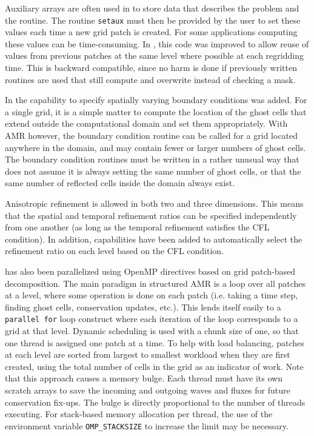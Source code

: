 Auxiliary arrays are often used in \clawpack to store data that
describes the problem and the routine.
The routine \texttt{setaux} must then be provided by the user to set these values each time a
new grid patch is created.  For some applications computing these values can be time-consuming.  In ,
this code was improved to allow reuse of values from previous patches at
the same level where possible at each regridding time.
This is backward compatible, since no harm is done if previously
written routines are used that still compute and overwrite instead of
checking a mask.

In  the capability to specify spatially varying boundary
conditions was added. For a single grid, it is a simple matter to
compute the location of the ghost cells that extend outside the
computational domain and set them appropriately.  With AMR however,
the boundary condition routine can be called for a grid located
anywhere in the domain, and may contain fewer or larger numbers of
ghost cells. The boundary condition routines must be written in a
rather unusual way that does not assume it is always setting the same
number of ghost cells, or that the same number of reflected cells
inside the domain always exist.  

Anisotropic refinement is allowed in both two and three dimensions.
This means that the spatial and temporal refinement ratios can be
specified independently from one another (as long as the temporal
refinement satisfies the CFL condition).  In addition, capabilities
have been added to automatically select the refinement ratio on each
level based on the CFL condition. 

\amrclaw has also been
parallelized using OpenMP directives based on grid patch-based decomposition.
The main paradigm in structured AMR is a loop over all patches at a level, where
some operation is done on each patch (i.e. taking a time step, finding ghost
cells, conservation updates, etc.).  This lends itself easily to a {\tt parallel
for} loop construct where each iteration of the loop corresponds to a grid at
that level. Dynamic scheduling is used with a chunk size of one, so that one
thread is assigned one patch at a time. To help with load balancing, patches at
each level are sorted from largest to smallest workload when they are first
created, using the total number of cells in the grid as an indicator of work.
Note that this approach causes a memory bulge. Each thread must have its own
scratch arrays to save the incoming and outgoing waves and fluxes for future
conservation fix-ups. The bulge is directly proportional to the number of
threads executing. For stack-based memory allocation per thread, the use of the
environment variable {\tt OMP\_STACKSIZE} to increase the limit may be
necessary.

